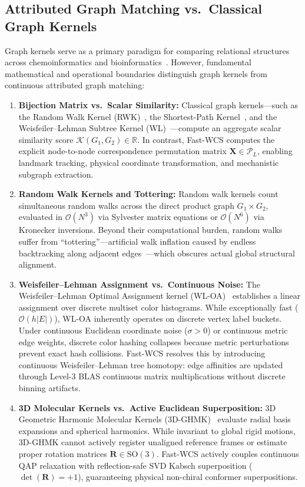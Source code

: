 \documentclass[a4paper,fleqn]{cas-dc}
\theoremstyle{thmstyleone}
\theoremstyle{thmstyletwo}
\theoremstyle{thmstylethree}
\begin{document}
\subsection{Attributed Graph Matching vs.\ Classical Graph Kernels}
\label{sec:graph_kernels}
Graph kernels serve as a primary paradigm for comparing relational structures across chemoinformatics and bioinformatics~\cite{vishwanathan2010}. However, fundamental mathematical and operational boundaries distinguish graph kernels from continuous attributed graph matching:
\begin{enumerate}
    \item \textbf{Bijection Matrix vs.\ Scalar Similarity:} Classical graph kernels---such as the Random Walk Kernel (RWK)~\cite{kashima2003marginalized, vishwanathan2010}, the Shortest-Path Kernel~\cite{borgwardt2005shortest}, and the Weisfeiler--Lehman Subtree Kernel (WL)~\cite{shervashidze2011weisfeiler}---compute an aggregate scalar similarity score $\mathcal{K}(G_1, G_2) \in \mathbb{R}$. In contrast, Fast-WCS computes the explicit node-to-node correspondence permutation matrix $\mathbf{X} \in \mathcal{P}_L$, enabling landmark tracking, physical coordinate transformation, and mechanistic subgraph extraction.
    \item \textbf{Random Walk Kernels and Tottering:} Random walk kernels count simultaneous random walks across the direct product graph $G_1 \times G_2$, evaluated in $\mathcal{O}(N^3)$ via Sylvester matrix equations or $\mathcal{O}(N^6)$ via Kronecker inversions. Beyond their computational burden, random walks suffer from ``tottering''---artificial walk inflation caused by endless backtracking along adjacent edges~\cite{mahe2005graph}---which obscures actual global structural alignment.
    \item \textbf{Weisfeiler--Lehman Assignment vs.\ Continuous Noise:} The Weisfeiler--Lehman Optimal Assignment kernel (WL-OA)~\cite{kriege2016valid} establishes a linear assignment over discrete multiset color histograms. While exceptionally fast ($\mathcal{O}(h|E|)$), WL-OA inherently operates on discrete vertex label buckets. Under continuous Euclidean coordinate noise ($\sigma > 0$) or continuous metric edge weights, discrete color hashing collapses because metric perturbations prevent exact hash collisions. Fast-WCS resolves this by introducing continuous Weisfeiler--Lehman tree homotopy: edge affinities are updated through Level-3 BLAS continuous matrix multiplications without discrete binning artifacts.
    \item \textbf{3D Molecular Kernels vs.\ Active Euclidean Superposition:} 3D Geometric Harmonic Molecular Kernels (3D-GHMK)~\cite{mahe2005graph} evaluate radial basis expansions and spherical harmonics. While invariant to global rigid motions, 3D-GHMK cannot actively register unaligned reference frames or estimate proper rotation matrices $\mathbf{R} \in \mathrm{SO}(3)$. Fast-WCS actively couples continuous QAP relaxation with reflection-safe SVD Kabsch superposition ($\det(\mathbf{R}) = +1$), guaranteeing physical non-chiral conformer superpositions.
\end{enumerate}
\end{document}
